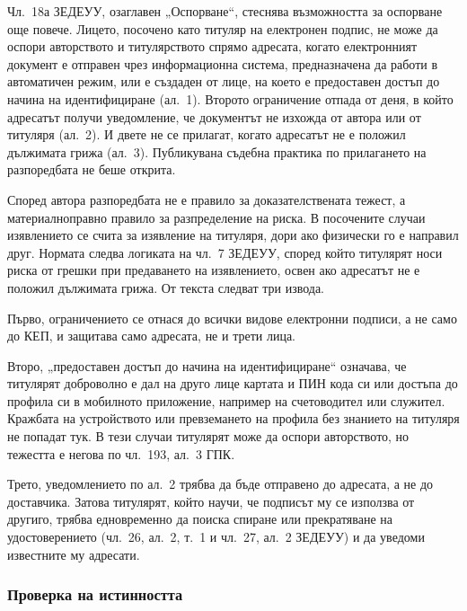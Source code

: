 Чл.~18а ЗЕДЕУУ, озаглавен „Оспорване“, стеснява възможността за оспорване още повече.
Лицето, посочено като титуляр на електронен подпис, не може да оспори авторството и
титулярството спрямо адресата, когато електронният документ е отправен чрез информационна
система, предназначена да работи в автоматичен режим, или е създаден от лице, на което е
предоставен достъп до начина на идентифициране (ал.~1). Второто ограничение отпада от
деня, в който адресатът получи уведомление, че документът не изхожда от автора или от
титуляря (ал.~2). И двете не се прилагат, когато адресатът не е положил дължимата грижа
(ал.~3). Публикувана съдебна практика по прилагането на разпоредбата не беше открита.

Според автора разпоредбата не е правило за доказателствената тежест, а материалноправно
правило за разпределение на риска. В посочените случаи изявлението се счита за изявление
на титуляря, дори ако физически го е направил друг. Нормата следва логиката на чл.~7
ЗЕДЕУУ, според който титулярят носи риска от грешки при предаването на изявлението, освен
ако адресатът не е положил дължимата грижа. От текста следват три извода.

Първо, ограничението се отнася до всички видове електронни подписи, а не само до КЕП, и
защитава само адресата, не и трети лица.

Второ, „предоставен достъп до начина на идентифициране“ означава, че титулярят доброволно
е дал на друго лице картата и ПИН кода си или достъпа до профила си в мобилното
приложение, например на счетоводител или служител. Кражбата на устройството или
превземането на профила без знанието на титуляря не попадат тук. В тези случаи титулярят
може да оспори авторството, но тежестта е негова по чл.~193, ал.~3 ГПК.

Трето, уведомлението по ал.~2 трябва да бъде отправено до адресата, а не до доставчика.
Затова титулярят, който научи, че подписът му се използва от другиго, трябва едновременно
да поиска спиране или прекратяване на удостоверението (чл.~26, ал.~2, т.~1 и чл.~27,
ал.~2 ЗЕДЕУУ) и да уведоми известните му адресати.

\subsubsection{Проверка на истинността}
\label{sec:proverka-istinnost}

